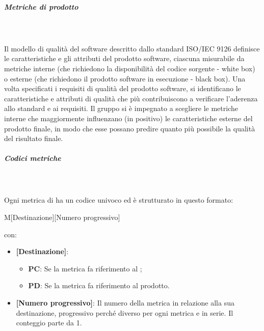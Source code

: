 \subparagraph{Metriche di prodotto}\mbox{}\\ \\
Il modello di qualità del software descritto dallo standard ISO/IEC 9126 definisce le caratteristiche e gli attributi del prodotto software, ciascuna misurabile da metriche interne (che richiedono la disponibilità del codice sorgente - white box) o esterne (che richiedono il prodotto software in esecuzione - black box).
Una volta specificati i requisiti di qualità del prodotto software, si identificano le caratteristiche e attributi di qualità che più contribuiscono a verificare l'aderenza allo standard e ai requisiti.
Il gruppo \Gruppo{} si è impegnato a scegliere le metriche interne che maggiormente influenzano (in positivo) le caratteristiche esterne del prodotto finale, in modo che esse possano predire quanto più possibile la qualità del risultato finale.

\subparagraph{Codici metriche}\mbox{}\\ \\
Ogni metrica di  ha un codice univoco ed è strutturato in questo formato:
\begin{center}
    M[Destinazione][Numero progressivo]
\end{center}
con:
\begin{itemize}  
    \item \textbf{[Destinazione]}:
    \begin{itemize}
        \item \textbf{PC}: Se la metrica fa riferimento al ;
        \item \textbf{PD}: Se la metrica fa riferimento al prodotto.
    \end{itemize}
    \item \textbf{[Numero progressivo]}: Il numero della metrica in relazione alla sua destinazione, progressivo perché diverso per ogni metrica e in serie. Il conteggio parte da 1.
\end{itemize}

